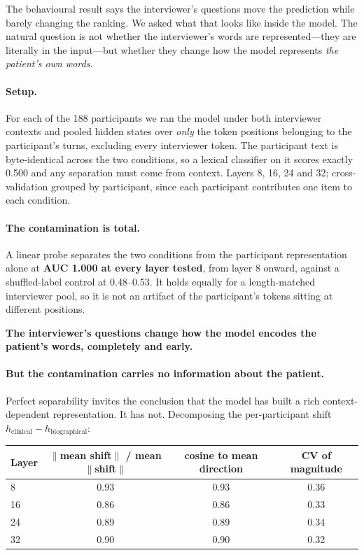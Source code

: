 \documentclass{article}
\begin{document}
The behavioural result says the interviewer's questions move the prediction
while barely changing the ranking. We asked what that looks like inside the
model. The natural question is not whether the interviewer's words are
represented---they are literally in the input---but whether they change how the
model represents \emph{the patient's own words}.

\paragraph{Setup.} For each of the 188 participants we ran the model under both
interviewer contexts and pooled hidden states over \emph{only} the token
positions belonging to the participant's turns, excluding every interviewer
token. The participant text is byte-identical across the two conditions, so a
lexical classifier on it scores exactly 0.500 and any separation must come from
context. Layers 8, 16, 24 and 32; cross-validation grouped by participant, since
each participant contributes one item to each condition.

\paragraph{The contamination is total.} A linear probe separates the two
conditions from the participant representation alone at \textbf{AUC 1.000 at
every layer tested}, from layer 8 onward, against a shuffled-label control at
0.48--0.53. It holds equally for a length-matched interviewer pool, so it is not
an artifact of the participant's tokens sitting at different positions.

\textbf{The interviewer's questions change how the model encodes the patient's
words, completely and early.}

\paragraph{But the contamination carries no information about the patient.}
Perfect separability invites the conclusion that the model has built a rich
context-dependent representation. It has not. Decomposing the per-participant
shift $h_{\text{clinical}} - h_{\text{biographical}}$:

\begin{center}
\begin{tabular}{lccc}
\toprule
Layer & $\lVert$mean shift$\rVert$ / mean $\lVert$shift$\rVert$ & cosine to mean direction & CV of magnitude \\
\midrule
8  & 0.93 & 0.93 & 0.36 \\
16 & 0.86 & 0.86 & 0.33 \\
24 & 0.89 & 0.89 & 0.34 \\
32 & 0.90 & 0.90 & 0.32 \\
\bottomrule
\end{tabular}
\end{center}
\end{document}
